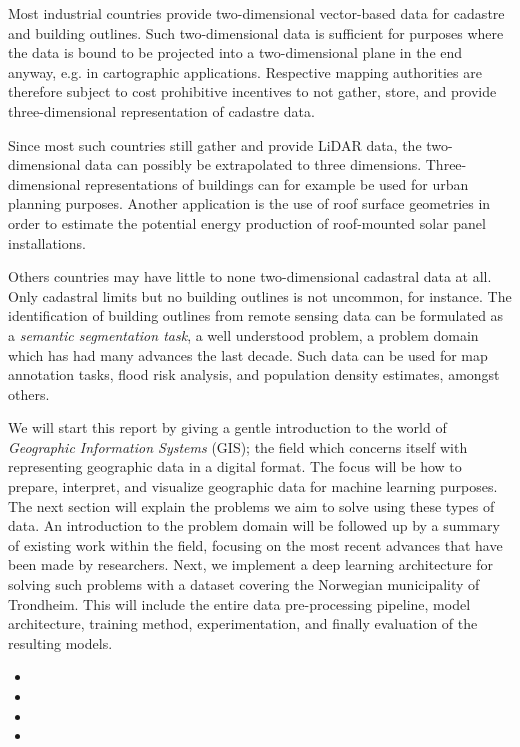 Most industrial countries provide two-dimensional vector-based data for cadastre and building outlines.
Such two-dimensional data is sufficient for purposes where the data is bound to be projected into a two-dimensional plane in the end anyway, e.g. in cartographic applications.
Respective mapping authorities are therefore subject to cost prohibitive incentives to not gather, store, and provide three-dimensional representation of cadastre data.

Since most such countries still gather and provide LiDAR data, the two-dimensional data can possibly be extrapolated to three dimensions.
Three-dimensional representations of buildings can for example be used for urban planning purposes.
Another application is the use of roof surface geometries in order to estimate the potential energy production of roof-mounted solar panel installations.

Others countries may have little to none two-dimensional cadastral data at all.
Only cadastral limits but no building outlines is not uncommon, for instance.
The identification of building outlines from remote sensing data can be formulated as a \textit{semantic segmentation task}, a well understood problem, a problem domain which has had many advances the last decade.
Such data can be used for map annotation tasks, flood risk analysis, and population density estimates, amongst others.

We will start this report by giving a gentle introduction to the world of \textit{Geographic Information Systems} (GIS); the field which concerns itself with representing geographic data in a digital format.
The focus will be how to prepare, interpret, and visualize geographic data for machine learning purposes.
The next section will explain the problems we aim to solve using these types of data.
An introduction to the problem domain will be followed up by a summary of existing work within the field, focusing on the most recent advances that have been made by researchers.
Next, we implement a deep learning architecture for solving such problems with a dataset covering the Norwegian municipality of Trondheim.
This will include the entire data pre-processing pipeline, model architecture, training method, experimentation, and finally evaluation of the resulting models.

\begin{itemize}
  \item {}
  \item {}
  \item {}
  \item {}
\end{itemize}
